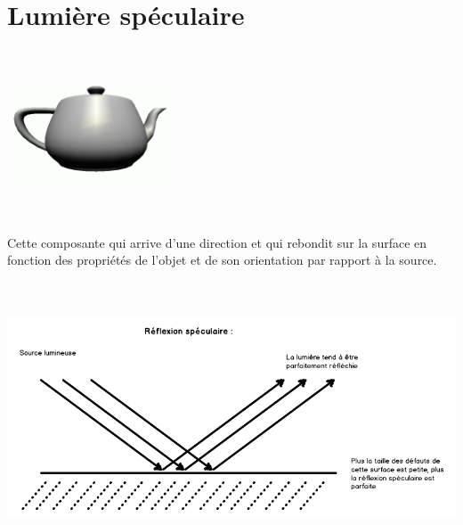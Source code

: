 \section{Lumière spéculaire}
\begin{center}
\includegraphics[width=5cm,height=5cm]{pipeline/images/objet_speculaire.png}
\end{center}
Cette composante qui arrive d'une direction et qui rebondit sur la surface en fonction des propriétés de l'objet et de son orientation par rapport à la source.
\\\\
\begin{center}
\includegraphics[width=17cm,height=7cm]{pipeline/images/reflexion_speculaire.png}
\end{center}

